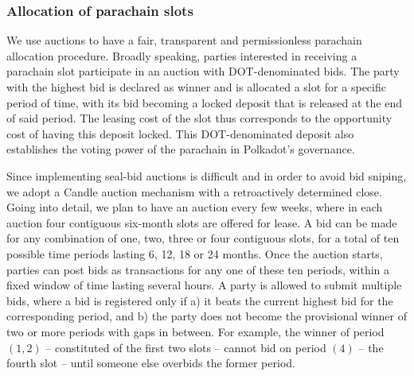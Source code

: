 \documentclass{article}
\begin{document}
\subsubsection{Allocation of parachain slots}\label{s:pAllocation}

We use auctions to have a fair, transparent and permissionless parachain allocation procedure. 
Broadly speaking, parties interested in receiving a parachain slot participate in an auction with DOT-denominated bids. The party with the highest bid is declared as winner and is allocated a slot for a specific period of time, with its bid becoming a locked deposit that is released at the end of said period. The leasing cost of the slot thus corresponds to the opportunity cost of having this deposit locked. This DOT-denominated deposit also establishes the voting power of the parachain in Polkadot's governance.

Since implementing seal-bid auctions is difficult and in order to avoid bid sniping, we adopt a Candle auction \cite{Fuellbrunn:2012:CandleAuction} mechanism with a retroactively determined close. 
Going into detail, we plan to have an auction every few weeks, where in each auction four contiguous six-month slots are offered for lease. A bid can be made for any combination of one, two, three or four contiguous slots, for a total of ten possible time periods lasting 6, 12, 18 or 24 months. Once the auction starts, parties can post bids as transactions for any one of these ten periods, within a fixed window of time lasting several hours. A party is allowed to submit multiple bids, where a bid is registered only if a) it beats the current highest bid for the corresponding period, and b) the party does not become the provisional winner of two or more periods with gaps in between. For example, the winner of period $(1,2)$ -- constituted of the first two slots -- cannot bid on period $(4)$ -- the fourth slot -- until someone else overbids the former period. 

\end{document}
